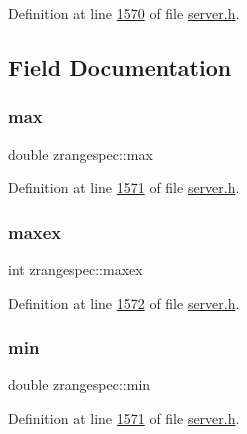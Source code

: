 Definition at line \hyperlink{server_8h_source_l01570}{1570} of file \hyperlink{server_8h_source}{server.\+h}.



\subsection{Field Documentation}
\mbox{\label{structzrangespec_a66215d3127231dc4c25564c6edc4e8c6}} 
\subsubsection{\texorpdfstring{max}{max}}
{\footnotesize\ttfamily double zrangespec\+::max}



Definition at line \hyperlink{server_8h_source_l01571}{1571} of file \hyperlink{server_8h_source}{server.\+h}.

\mbox{\label{structzrangespec_afac44097ac0846db7dd1609fa8365bb2}} 
\subsubsection{\texorpdfstring{maxex}{maxex}}
{\footnotesize\ttfamily int zrangespec\+::maxex}



Definition at line \hyperlink{server_8h_source_l01572}{1572} of file \hyperlink{server_8h_source}{server.\+h}.

\mbox{\label{structzrangespec_acd10595ad54934dbe57573a2818095cc}} 
\subsubsection{\texorpdfstring{min}{min}}
{\footnotesize\ttfamily double zrangespec\+::min}



Definition at line \hyperlink{server_8h_source_l01571}{1571} of file \hyperlink{server_8h_source}{server.\+h}.

\mbox{\label{structzrangespec_afa6be3c7c99e2487e04dbea9ca2e6839}} 
